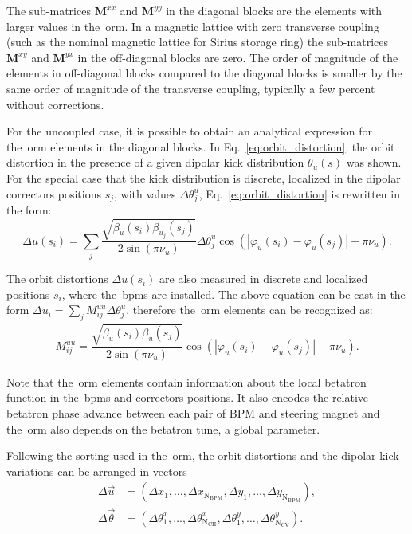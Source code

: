 The sub-matrices $\mathbf{M}^{xx}$ and $\mathbf{M}^{yy}$ in the diagonal blocks are the elements with larger values in the~\gls{orm}. In a magnetic lattice with zero transverse coupling (such as the nominal magnetic lattice for Sirius storage ring) the sub-matrices $\mathbf{M}^{xy}$ and $\mathbf{M}^{yx}$ in the off-diagonal blocks are zero. The order of magnitude of the elements in off-diagonal blocks compared to the diagonal blocks is smaller by the same order of magnitude of the transverse coupling, typically a few percent without corrections.

For the uncoupled case, it is possible to obtain an analytical expression for the~\gls{orm} elements in the diagonal blocks. In Eq.~\eqref{eq:orbit_distortion}, the orbit distortion in the presence of a given dipolar kick distribution $\theta_u(s)$ was shown. For the special case that the kick distribution is discrete, localized in the dipolar correctors positions $s_j$, with values $\Delta \theta^{u}_{j}$, Eq.~\eqref{eq:orbit_distortion} is rewritten in the form:
\begin{equation}
    \Delta u(s_i) = \sum_{j} \dfrac{\sqrt{\beta_{u}(s_i)\beta_{u_j}(s_j)}}{2\sin\left(\pi\nu_{u}\right)} \Delta \theta^{u}_j \cos\left( |\varphi_{u}(s_i) - \varphi_{u}(s_j)| - \pi\nu_{u} \right).
    \label{eq:discrete_orbit_distortion}
\end{equation}

The orbit distortions $\Delta u(s_i)$ are also measured in discrete and localized positions $s_i$, where the~\gls{bpm}s are installed. The above equation can be cast in the form $\Delta u_i = \sum_{j} M_{ij}^{uu} \Delta \theta_{j}^{u}$, therefore the~\gls{orm} elements can be recognized as:
\begin{align}
M_{ij}^{uu} = \dfrac{\sqrt{\beta_{u}(s_i)\beta_{u}(s_j)}}{2\sin\left(\pi\nu_{u}\right)}\cos\left( |\varphi_{u}(s_i) - \varphi_{u}(s_j)| - \pi\nu_{u} \right).
\label{eq:matrix_elements}
\end{align}

Note that the~\gls{orm} elements contain information about the local betatron function in the~\gls{bpm}s and correctors positions. It also encodes the relative betatron phase advance between each pair of BPM and steering magnet and the~\gls{orm} also depends on the betatron tune, a global parameter. 

Following the sorting used in the~\gls{orm}, the orbit distortions and the dipolar kick variations can be arranged in vectors
\begin{align*}
    \Delta \vec{u} &= \left(\Delta x_1, \ldots, \Delta x_{\mathrm{N}_{\mathrm{BPM}}}, \Delta y_1, \ldots, \Delta y_{\mathrm{N}_{\mathrm{BPM}}}\right), \\
    \Delta \vec{\theta} &= \left(\Delta \theta_1^x, \ldots, \Delta \theta_{\mathrm{N}_{\mathrm{CH}}}^x, \Delta \theta_1^y, \ldots, \Delta \theta_{\mathrm{N}_{\mathrm{CV}}}^y\right).
\end{align*}

